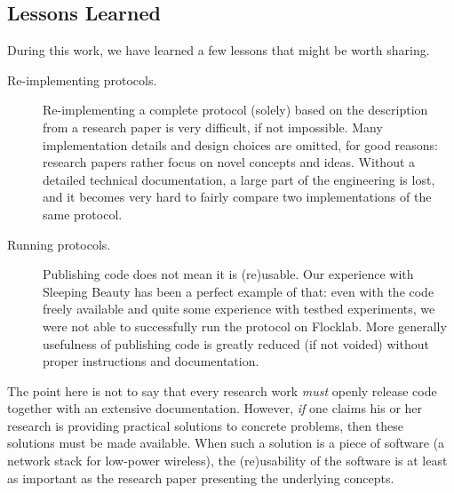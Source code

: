 \subsection{Lessons Learned}
\label{sec:lessonsLearned}

During this work, we have learned a few lessons that might be worth sharing.
\begin{description}

	\item[Re-implementing protocols.] Re-implementing a complete protocol (solely) based on the description from a research paper is very difficult, if not impossible. Many implementation details and design choices are omitted, for good reasons: research papers rather focus on novel concepts and ideas.
	Without a detailed technical documentation, a large part of the engineering is lost, and it becomes very hard to fairly compare two implementations of the same protocol.

	\item[Running protocols.] Publishing code does not mean it is (re)usable. Our experience with Sleeping Beauty has been a perfect example of that: even with the code freely available and quite some experience with testbed experiments, we were not able to successfully run the protocol on Flocklab.
	More generally usefulness of publishing code is greatly reduced (if not voided) without proper instructions and documentation.

\end{description}

The point here is not to say that every research work \emph{must} openly release code together with an extensive documentation.
However, \emph{if} one claims his or her research is providing practical solutions to concrete problems, then these solutions must be made available.
When such a solution is a piece of software (\eg a network stack for low-power wireless), the (re)usability of the software is at least as important as the research paper presenting the underlying concepts.

